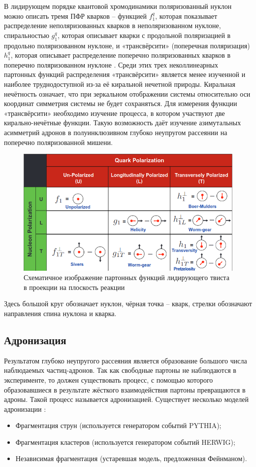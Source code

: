 \documentclass{extarticle}
\begin{document}
 В лидирующем порядке квантовой хромодинамики поляризованный нуклон можно описать тремя ПФР кварков – функцией $f_1^q$, которая показывает распределение неполяризованных кварков в неполяризованном нуклоне, спиральностью $g_1^q$, которая описывает кварки с продольной поляризацией в продольно поляризованном нуклоне, и «трансвёрсити» (поперечная поляризация) $h_1^q$, которая описывает распределение поперечно поляризованных кварков в поперечно поляризованном нуклоне \cite{Hagler}. Среди этих трех неколлинеарных партонных функций распределения «трансвёрсити» является менее изученной и наиболее труднодоступной из-за её киральной нечетной природы. Киральная нечётность означает, что при зеркальном отображении системы относительно оси координат симметрия системы не будет сохраняться.
Для измерения функции «трансвёрсити» необходимо изучение процесса, в котором участвуют две кирально-нечётные функции. Такую возможность даёт изучение азимутальных асимметрий адронов в полуинклюзивном глубоко неупругом рассеянии на поперечно поляризованной мишени. 


\begin{figure}[h]
	\centering
	\includegraphics[width=\linewidth]{functions.png}
	\caption{Схематичное изображение партонных функций лидирующего твиста в проекции на плоскость реакции}
	\label{fig:functions}
\end{figure} 
Здесь большой круг обозначает нуклон, чёрная точка -- кварк, стрелки обозначают направления спина нуклона и кварка.

\subsection{Адронизация}
Результатом глубоко неупругого рассеяния является образование большого числа наблюдаемых частиц-адронов. Так как свободные партоны не наблюдаются в эксперименте, то должен существовать процесс, с помощью которого образовавшиеся в результате жёсткого взаимодействия партоны превращаются в адроны. Такой процесс называется адронизацией. Существует несколько моделей адронизации  \cite{Hadronization}:
\begin{itemize}
\item Фрагментация струн (используется генератором событий PYTHIA);
\item Фрагментация кластеров (используется генератором событий HERWIG);
\item Независимая фрагментация (устаревшая модель, предложенная Фейнманом).
\end{itemize}
 
\end{document}
